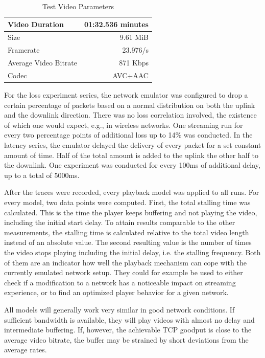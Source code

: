 \begin{table}[htbp]
	\centering
	\caption{Test Video Parameters}
	\label{c3:tbl:videoparams}
	\begin{tabular}{l|r}
	Video Duration	& 01:32.536 minutes \\ \hline
	Size & 9.61 MiB \\ \hline
	Framerate & 23.976/s \\ \hline
	Average Video Bitrate & 871 Kbps \\ \hline
	Codec & AVC+AAC \\ \hline
	\end{tabular}
\end{table}

For the loss experiment series, the network emulator was configured to drop a certain percentage of packets based on a normal distribution on both the uplink and the downlink direction. There was no loss correlation involved, the existence of which one would expect, e.g., in wireless networks. One streaming run for every two percentage points of additional loss up to 14\% was conducted.
In the latency series, the emulator delayed the delivery of every packet for a set constant amount of time. Half of the total amount is added to the uplink the other half to the downlink. One experiment was conducted for every 100ms of additional delay, up to a total of 5000ms.

After the traces were recorded, every playback model was applied to all runs. For every model, two data points were computed. First, the total stalling time was calculated. This is the time the player keeps buffering and not playing the video, including the initial start delay. To attain results comparable to the other measurements, the stalling time is calculated relative to the total video length instead of an absolute value. The second resulting value is the number of times the video stops playing including the initial delay, i.e. the stalling frequency. Both of them are an indicator how well the playback mechanism can cope with the currently emulated network setup. They could for example be used to either check if a modification to a network has a noticeable impact on streaming experience, or to find an optimized player behavior for a given network.

All models will generally work very similar in good network conditions. If sufficient bandwidth is available, they will play videos with almost no delay and  intermediate buffering. If, however, the achievable TCP goodput is close to the average video bitrate, the buffer may be strained by short deviations from the average rates. %

